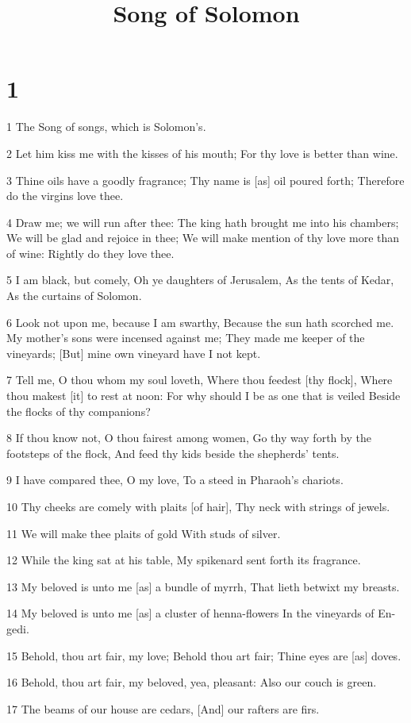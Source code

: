

\title{Song of Solomon}

\chapter{1}

\par 1 The Song of songs, which is Solomon's.
\par 2 Let him kiss me with the kisses of his mouth; For thy love is better than wine.
\par 3 Thine oils have a goodly fragrance; Thy name is [as] oil poured forth; Therefore do the virgins love thee.
\par 4 Draw me; we will run after thee: The king hath brought me into his chambers; We will be glad and rejoice in thee; We will make mention of thy love more than of wine: Rightly do they love thee.
\par 5 I am black, but comely, Oh ye daughters of Jerusalem, As the tents of Kedar, As the curtains of Solomon.
\par 6 Look not upon me, because I am swarthy, Because the sun hath scorched me. My mother's sons were incensed against me; They made me keeper of the vineyards; [But] mine own vineyard have I not kept.
\par 7 Tell me, O thou whom my soul loveth, Where thou feedest [thy flock], Where thou makest [it] to rest at noon: For why should I be as one that is veiled Beside the flocks of thy companions?
\par 8 If thou know not, O thou fairest among women, Go thy way forth by the footsteps of the flock, And feed thy kids beside the shepherds' tents.
\par 9 I have compared thee, O my love, To a steed in Pharaoh's chariots.
\par 10 Thy cheeks are comely with plaits [of hair], Thy neck with strings of jewels.
\par 11 We will make thee plaits of gold With studs of silver.
\par 12 While the king sat at his table, My spikenard sent forth its fragrance.
\par 13 My beloved is unto me [as] a bundle of myrrh, That lieth betwixt my breasts.
\par 14 My beloved is unto me [as] a cluster of henna-flowers In the vineyards of En-gedi.
\par 15 Behold, thou art fair, my love; Behold thou art fair; Thine eyes are [as] doves.
\par 16 Behold, thou art fair, my beloved, yea, pleasant: Also our couch is green.
\par 17 The beams of our house are cedars, [And] our rafters are firs.

